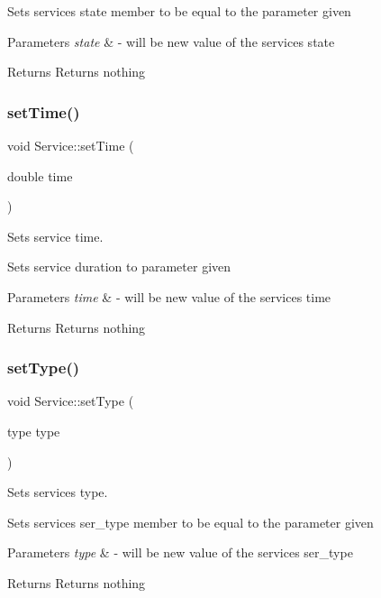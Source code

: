 Sets service\textquotesingle{}s state member to be equal to the parameter given 
\begin{DoxyParams}{Parameters}
{\em state} & -\/ will be new value of the service\textquotesingle{}s state \\
\hline
\end{DoxyParams}
\begin{DoxyReturn}{Returns}
Returns nothing 
\end{DoxyReturn}
\mbox{\label{class_service_aed76805ea044b29f0dafe65a7d39f2dc}} 
\subsubsection{\texorpdfstring{set\+Time()}{setTime()}}
{\footnotesize\ttfamily void Service\+::set\+Time (\begin{DoxyParamCaption}\item[{double}]{time }\end{DoxyParamCaption})}



Sets service time. 

Sets service duration to parameter given 
\begin{DoxyParams}{Parameters}
{\em time} & -\/ will be new value of the service\textquotesingle{}s time \\
\hline
\end{DoxyParams}
\begin{DoxyReturn}{Returns}
Returns nothing 
\end{DoxyReturn}
\mbox{\label{class_service_af26945add8ad6504432fa0c62c8c2769}} 
\subsubsection{\texorpdfstring{set\+Type()}{setType()}}
{\footnotesize\ttfamily void Service\+::set\+Type (\begin{DoxyParamCaption}\item[{type type}]{ }\end{DoxyParamCaption})}



Sets service\textquotesingle{}s type. 

Sets service\textquotesingle{}s ser\+\_\+type member to be equal to the parameter given 
\begin{DoxyParams}{Parameters}
{\em type} & -\/ will be new value of the service\textquotesingle{}s ser\+\_\+type \\
\hline
\end{DoxyParams}
\begin{DoxyReturn}{Returns}
Returns nothing 
\end{DoxyReturn}


